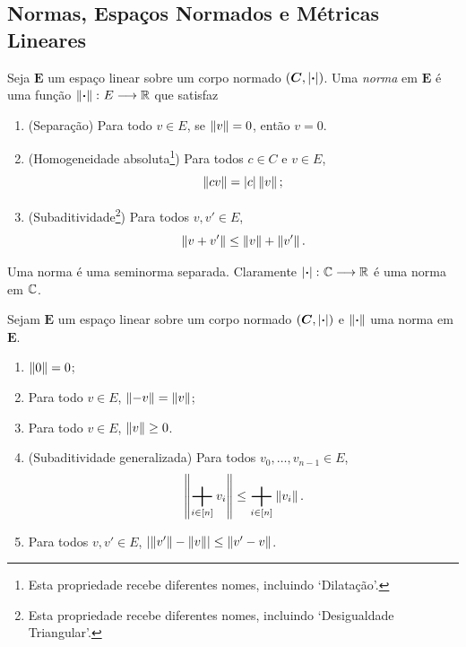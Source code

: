\subsection{Normas, Espaços Normados e Métricas Lineares}

\begin{defi}
Seja $\bm E$ um espaço linear sobre um corpo normado $(\bm C,\left\vert{\bm{\cdot}}\right\vert)$. Uma \emph{norma} em $\bm E$ é uma função $\left\Vert{\bm{\cdot}}\right\Vert\colon E \longrightarrow \mathbb{R}$
que satisfaz
	\begin{enumerate}
	\item (Separação) Para todo $v \in E$, se $\left\Vert{v}\right\Vert=0$, então $v=0$.
	\item (Homogeneidade absoluta\footnote{Esta propriedade recebe diferentes nomes, incluindo `Dilatação'.}) Para todos $c \in C$ e $v \in E$,
		\begin{equation*}
		\left\Vert{cv}\right\Vert = \left\vert{c}\right\vert\left\Vert{v}\right\Vert;
		\end{equation*}
	\item (Subaditividade\footnote{Esta propriedade recebe diferentes nomes, incluindo `Desigualdade Triangular'.}) Para todos $v,v' \in E$,
		\begin{equation*}
		\left\Vert{v + v'}\right\Vert \leq \left\Vert{v}\right\Vert + \left\Vert{v'}\right\Vert.
		\end{equation*}
	\end{enumerate}
\end{defi}

Uma norma é uma seminorma separada. Claramente $\left\vert{\bm{\cdot}}\right\vert\colon \mathbb{C} \longrightarrow \mathbb{R}$ é uma norma em $\mathbb{C}$.

\begin{prop}
Sejam $\bm E$ um espaço linear sobre um corpo normado $(\bm C,\left\vert{\bm{\cdot}}\right\vert)$ e $\left\Vert{\bm{\cdot}}\right\Vert$ uma norma em $\bm E$.
	\begin{enumerate}
	\item $\left\Vert{0}\right\Vert=0$;
	\item Para todo $v \in E$, $\left\Vert{-v}\right\Vert=\left\Vert{v}\right\Vert$;
	\item Para todo $v \in E$, $\left\Vert{v}\right\Vert \geq 0$.
	\item (Subaditividade generalizada) Para todos $v_0,\dots,v_{n-1} \in E$,
		\begin{equation*}
		\nor{\sum_{i \in [n]} v_i} \leq \sum_{i \in [n]} \nor{v_i}.
		\end{equation*}
	\item Para todos $v,v' \in E$, $\left\vert{\left\Vert{v'}\right\Vert-\left\Vert{v}\right\Vert}\right\vert \leq \left\Vert{v'-v}\right\Vert$.
	\end{enumerate}
\end{prop}

